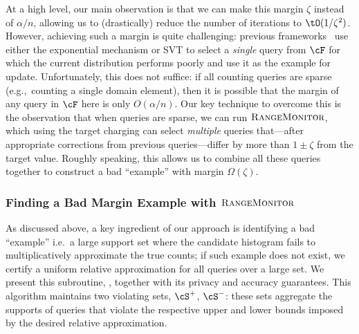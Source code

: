 At a high level, our main observation is that we can make this margin $\zeta$ instead of $\alpha/n$, allowing us to (drastically) 
reduce the number of iterations to $\tO(1/\zeta^2)$. 
However, achieving such a margin is quite challenging: previous frameworks~\citep{HardtR10,HardtLM12,GuptaRU12} use either the 
exponential mechanism or \textsc{SVT} to select a \emph{single} query from $\cF$ for which the current distribution performs poorly and use it
as the example for update. Unfortunately, this does not suffice: if all counting queries are sparse (e.g.,~counting a single domain element), 
then it is possible that the margin of any query in $\cF$ here is only $O(\alpha/n)$.
Our key technique to overcome this is the observation that when queries are sparse, we can run $\textsc{RangeMonitor}$, which using the target charging can select \emph{multiple} queries that---after appropriate corrections from previous queries---differ by more than $1 \pm \zeta$ from the target value. Roughly speaking, this allows us to combine all these queries together to construct a bad ``example'' with margin $\Omega(\zeta)$.


\subsubsection{Finding a Bad Margin Example with $\textsc{RangeMonitor}$}

As discussed above, a key ingredient of our approach is identifying a bad ``example'' i.e.~a large support set where the candidate histogram fails to multiplicatively approximate the true counts; if such example does not exist, we certify a uniform relative approximation for all queries over a large set. We present this subroutine, , together with its privacy and accuracy guarantees. This algorithm maintains two violating sets, $\cS^+$, $\cS^-$: these sets aggregate the supports of queries that violate the respective upper and lower bounds imposed by the desired relative approximation. 

